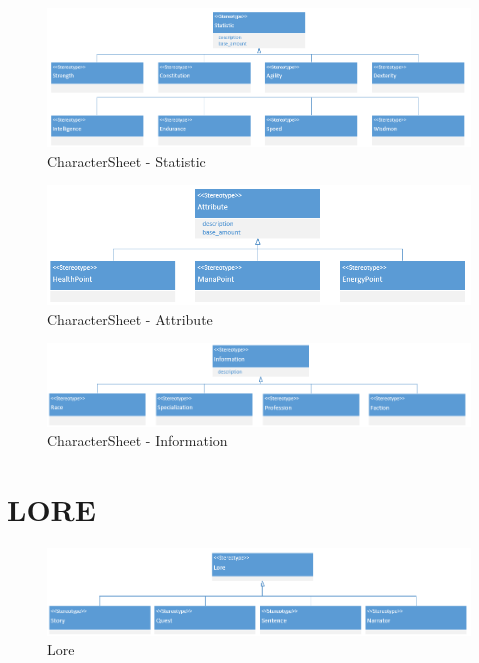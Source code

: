 \begin{figure}
    \includegraphics[width=20cm]{10_img/Z_annexeA/cs_statistic.PNG} 
    \caption{CharacterSheet - Statistic}
\end{figure}


\begin{figure}[H]
    \includegraphics[width=14cm]{10_img/Z_annexeA/cs_attribute.PNG} 
    \caption{CharacterSheet - Attribute}
\end{figure}

\begin{figure}[H]
    \includegraphics[width=15cm]{10_img/Z_annexeA/cs_information.PNG} 
    \caption{CharacterSheet - Information}
\end{figure}


\section*{LORE} 
\begin{figure}[H]
    \includegraphics[width=15cm]{10_img/Z_annexeA/lore.PNG} 
    \caption{Lore}
\end{figure}


